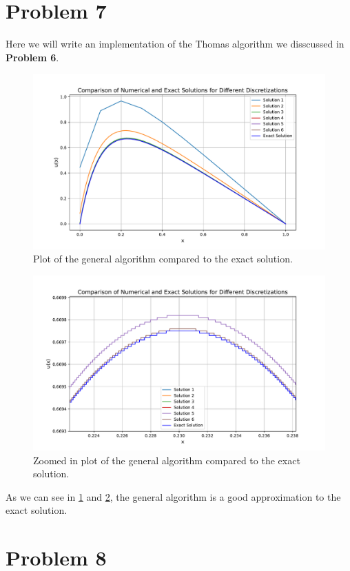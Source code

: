 \documentclass[english,notitlepage]{revtex4-1}  %
\begin{document}
\section*{Problem 7}
Here we will write an implementation of the Thomas algorithm we disscussed in 
\textbf{Problem 6}.

\begin{figure}%
    \centering %
    \includegraphics[scale=0.70]{problem7/general_algorithm_plot.pdf} %
    \caption{Plot of the general algorithm compared to the exact solution.} %
    \label{fig:general_algorithm} %
\end{figure}

\begin{figure}%
    \centering %
    \includegraphics[scale=0.70]{problem7/zoom_in_plot.pdf} %
    \caption{Zoomed in plot of the general algorithm compared to the exact solution.} %
    \label{fig:general_algorithm_zoomed} %
\end{figure}

As we can see in \figurename{ \ref{fig:general_algorithm}} and \figurename{ \ref{fig:general_algorithm_zoomed}}, the general algorithm is a good approximation to the exact solution.

\section*{Problem 8}
\end{document}
